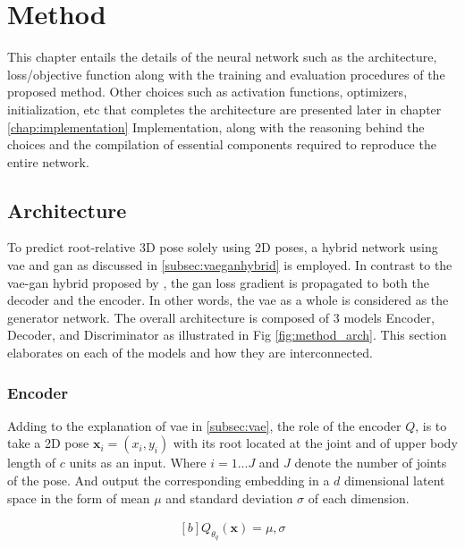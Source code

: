 \chapter{Method}
\label{chap:method}

This chapter entails the details of the neural network such as the architecture, loss/objective function along with the training and evaluation procedures of the proposed method. Other choices such as activation functions, optimizers, initialization, etc that completes the architecture are presented later in chapter \ref{chap:implementation} Implementation, along with the reasoning behind the choices and the compilation of essential components required to reproduce the entire network.

\section{Architecture}
To predict root-relative 3D pose solely using 2D poses, a hybrid network using \ac{vae} and \ac{gan} as discussed in \ref{subsec:vaeganhybrid} is employed. In contrast to the \ac{vae}-\ac{gan} hybrid proposed by \cite{autoencoding_beyond_pixels}, the \ac{gan} loss gradient is propagated to both the decoder and the encoder. In other words, the \ac{vae} as a whole is considered as the generator network. The overall architecture is composed of 3 models Encoder, Decoder, and Discriminator as illustrated in Fig \ref{fig:method_arch}. This section elaborates on each of the models and how they are interconnected. 

\subsection{Encoder}
Adding to the explanation of \ac{vae} in \ref{subsec:vae}, the role of the encoder $Q$, is to take a 2D pose $\textbf{x}_i = (x_i, y_i)$ with its root located at the joint and of upper body length of $c$ units as an input. Where $i = 1 ... J$ and $J$ denote the number of joints of the pose. And output the corresponding embedding in a $d$ dimensional latent space in the form of mean $\mu$ and standard deviation $\sigma$ of each dimension.

\begin{equation} \label{eqn:Q_fn}
    \begin{gathered}[b]
        Q_{\theta_q}(\textbf{x}) = \mu, \sigma
    \end{gathered}
\end{equation}

